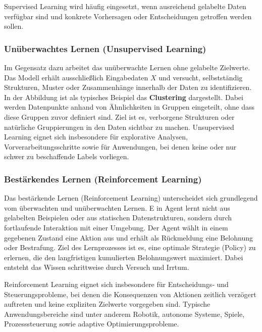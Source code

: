 Supervised Learning wird häufig eingesetzt, wenn ausreichend gelabelte Daten verfügbar sind und konkrete Vorhersagen oder Entscheidungen getroffen werden sollen.

	
\subsubsection{Unüberwachtes Lernen (Unsupervised Learning)}

Im Gegensatz dazu arbeitet das unüberwachte Lernen ohne gelabelte Zielwerte. Das Modell erhält ausschließlich Eingabedaten \(X\) und versucht, selbstständig Strukturen, Muster oder Zusammenhänge innerhalb der Daten zu identifizieren.
In der Abbildung ist als typisches Beispiel das \textbf{Clustering} dargestellt. Dabei werden Datenpunkte anhand von Ähnlichkeiten in Gruppen eingeteilt, ohne dass diese Gruppen zuvor definiert sind. Ziel ist es, verborgene Strukturen oder natürliche Gruppierungen in den Daten sichtbar zu machen.
Unsupervised Learning eignet sich insbesondere für explorative Analysen, Vorverarbeitungsschritte sowie für Anwendungen, bei denen keine oder nur schwer zu beschaffende Labels vorliegen. \cite{neuer2024unuberwachtes}


	


\subsubsection{Bestärkendes Lernen (Reinforcement Learning)}	
Das bestärkende Lernen (Reinforcement Learning) unterscheidet sich grundlegend vom überwachten und unüberwachten Lernen. E in Agent lernt nicht aus gelabelten Beispielen oder aus statischen Datenstrukturen, sondern durch fortlaufende Interaktion mit einer Umgebung.
Der Agent wählt in einem gegebenen Zustand eine Aktion aus und erhält als Rückmeldung eine Belohnung oder Bestrafung. Ziel des Lernprozesses ist es, eine optimale Strategie (Policy) zu erlernen, die den langfristigen kumulierten Belohnungswert maximiert. Dabei entsteht das Wissen schrittweise durch Versuch und Irrtum. \cite{kaelbling1996reinforcement}

Reinforcement Learning eignet sich insbesondere für Entscheidungs‑ und Steuerungsprobleme, bei denen die Konsequenzen von Aktionen zeitlich verzögert auftreten und keine expliziten Zielwerte vorgegeben sind. Typische Anwendungsbereiche sind unter anderem Robotik, autonome Systeme, Spiele, Prozesssteuerung sowie adaptive Optimierungsprobleme. \cite{li2017deep}
	
